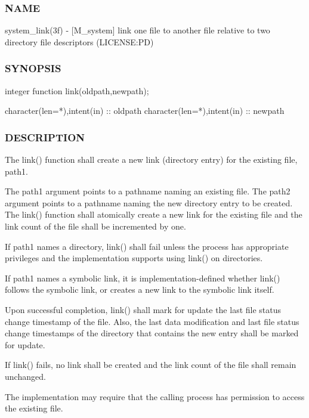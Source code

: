 \subsubsection*{N\+A\+ME}

system\+\_\+link(3f) -\/ \mbox{[}M\+\_\+system\mbox{]} link one file to another file relative to two directory file descriptors (L\+I\+C\+E\+N\+SE\+:PD) 

\subsubsection*{S\+Y\+N\+O\+P\+S\+IS}

\begin{DoxyVerb}integer function link(oldpath,newpath);

 character(len=*),intent(in) :: oldpath
 character(len=*),intent(in) :: newpath
\end{DoxyVerb}


\subsubsection*{D\+E\+S\+C\+R\+I\+P\+T\+I\+ON}

The link() function shall create a new link (directory entry) for the existing file, path1.

The path1 argument points to a pathname naming an existing file. The path2 argument points to a pathname naming the new directory entry to be created. The link() function shall atomically create a new link for the existing file and the link count of the file shall be incremented by one.

If path1 names a directory, link() shall fail unless the process has appropriate privileges and the implementation supports using link() on directories.

If path1 names a symbolic link, it is implementation-\/defined whether link() follows the symbolic link, or creates a new link to the symbolic link itself.

Upon successful completion, link() shall mark for update the last file status change timestamp of the file. Also, the last data modification and last file status change timestamps of the directory that contains the new entry shall be marked for update.

If link() fails, no link shall be created and the link count of the file shall remain unchanged.

The implementation may require that the calling process has permission to access the existing file.

